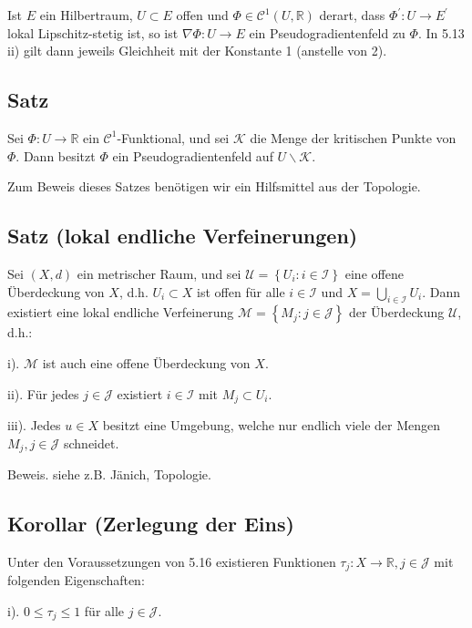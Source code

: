 \documentclass[10pt, letterpaper]{article}
\begin{document}
Ist $E$ ein Hilbertraum, $U \subset E$ offen und $\Phi \in \mathcal{C}^{1}(U, \mathbb{R})$ derart, dass $\Phi^{\prime}: U \rightarrow E^{\prime}$ lokal Lipschitz-stetig ist, so ist $\nabla \Phi: U \rightarrow E$ ein Pseudogradientenfeld zu $\Phi$. In 5.13 ii) gilt dann jeweils Gleichheit mit der Konstante 1 (anstelle von 2).

\subsection*{Satz}

Sei $\Phi: U \rightarrow \mathbb{R}$ ein $\mathcal{C}^{1}$-Funktional, und sei $\mathcal{K}$ die Menge der kritischen Punkte von $\Phi$. Dann besitzt $\Phi$ ein Pseudogradientenfeld auf $U \backslash \mathcal{K}$.

Zum Beweis dieses Satzes benötigen wir ein Hilfsmittel aus der Topologie.

\subsection*{Satz (lokal endliche Verfeinerungen)}

Sei $(X, d)$ ein metrischer Raum, und sei $\mathcal{U}=\left\{U_{i}: i \in \mathcal{I}\right\}$ eine offene Überdeckung von $X$, d.h. $U_{i} \subset X$ ist offen für alle $i \in \mathcal{I}$ und $X=\bigcup_{i \in \mathcal{I}} U_{i}$. Dann existiert eine lokal endliche Verfeinerung $\mathcal{M}=\left\{M_{j}: j \in \mathcal{J}\right\}$ der Überdeckung $\mathcal{U}$, d.h.:

i). $\mathcal{M}$ ist auch eine offene Überdeckung von $X$.

ii). Für jedes $j \in \mathcal{J}$ existiert $i \in \mathcal{I}$ mit $M_{j} \subset U_{i}$.

iii). Jedes $u \in X$ besitzt eine Umgebung, welche nur endlich viele der Mengen $M_{j}, j \in \mathcal{J}$ schneidet.

Beweis. siehe z.B. Jänich, Topologie.

\subsection*{Korollar (Zerlegung der Eins)}

Unter den Voraussetzungen von 5.16 existieren Funktionen $\tau_{j}: X \rightarrow \mathbb{R}, j \in \mathcal{J}$ mit folgenden Eigenschaften:

i). $0 \leq \tau_{j} \leq 1$ für alle $j \in \mathcal{J}$.
\end{document}
